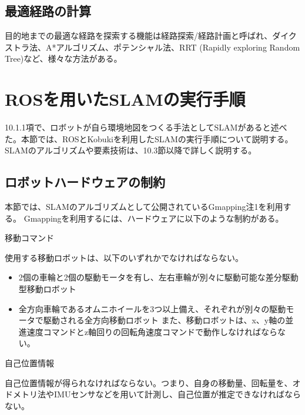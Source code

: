 \subsection{最適経路の計算}

目的地までの最適な経路を探索する機能は経路探索/経路計画と呼ばれ、ダイクストラ法、A*アルゴリズム、ポテンシャル法、RRT (Rapidly exploring Random Tree)など、様々な方法がある。

\section{ROSを用いたSLAMの実行手順}

10.1.1項で、ロボットが自ら環境地図をつくる手法としてSLAMがあると述べた。本節では、ROSとKobukiを利用したSLAMの実行手順について説明する。SLAMのアルゴリズムや要素技術は、10.3節以降で詳しく説明する。

\subsection{ロボットハードウェアの制約}

本節では、SLAMのアルゴリズムとして公開されているGmapping注1を利用する。 Gmappingを利用するには、ハードウェアに以下のような制約がある。

\setcounter{num}{0}

\circled{\thenum} 移動コマンド

使用する移動ロボットは、以下のいずれかでなければならない。

\begin{itemize}
\item 2個の車輪と2個の駆動モータを有し、左右車輪が別々に駆動可能な差分駆動型移動ロボット
\item 全方向車輪であるオムニホイールを3つ以上備え、それぞれが別々の駆動モータで駆動される全方向移動ロボット
また、移動ロボットは、x、y軸の並進速度コマンドとz軸回りの回転角速度コマンドで動作しなければならない。
\end{itemize}

\circled{\thenum} 自己位置情報

自己位置情報が得られなければならない。つまり、自身の移動量、回転量を、オドメトリ法やIMUセンサなどを用いて計測し、自己位置が推定できなければならない。

